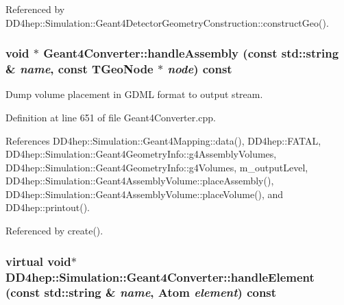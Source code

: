 Referenced by DD4hep::Simulation::Geant4DetectorGeometryConstruction::constructGeo().\hypertarget{class_d_d4hep_1_1_simulation_1_1_geant4_converter_a7705c4c5dfd0dc6cf119ef8340d2f9f6}{
\subsubsection[{handleAssembly}]{\setlength{\rightskip}{0pt plus 5cm}void $\ast$ Geant4Converter::handleAssembly (const std::string \& {\em name}, \/  const TGeoNode $\ast$ {\em node}) const}}
\label{class_d_d4hep_1_1_simulation_1_1_geant4_converter_a7705c4c5dfd0dc6cf119ef8340d2f9f6}


Dump volume placement in GDML format to output stream. 

Definition at line 651 of file Geant4Converter.cpp.

References DD4hep::Simulation::Geant4Mapping::data(), DD4hep::FATAL, DD4hep::Simulation::Geant4GeometryInfo::g4AssemblyVolumes, DD4hep::Simulation::Geant4GeometryInfo::g4Volumes, m\_\-outputLevel, DD4hep::Simulation::Geant4AssemblyVolume::placeAssembly(), DD4hep::Simulation::Geant4AssemblyVolume::placeVolume(), and DD4hep::printout().

Referenced by create().\hypertarget{class_d_d4hep_1_1_simulation_1_1_geant4_converter_ae0567fc7090fdc7ae74926c8a67f6536}{
\subsubsection[{handleElement}]{\setlength{\rightskip}{0pt plus 5cm}virtual void$\ast$ DD4hep::Simulation::Geant4Converter::handleElement (const std::string \& {\em name}, \/  {\bf Atom} {\em element}) const}}
\label{class_d_d4hep_1_1_simulation_1_1_geant4_converter_ae0567fc7090fdc7ae74926c8a67f6536}


